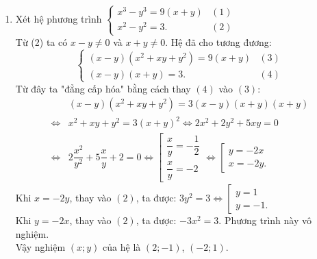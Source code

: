 \begin{ex}
{\begin{enumerate}
{\begin{align*}
\begin{array}{l}
\begin{array}{l}
 x \le 3\\
 x^2 - 8x + 10 = 0
 \end{array} \right.
 \end{array} \right. \Leftrightarrow \left[ \begin{array}{l}
 x = 2 + \sqrt 2 \\
 x = 4 - \sqrt 6 .
 \end{array} \right.
 \end{align*}}Kết hợp điều kiện ta được nghiệm của phương trình là 
$x = 2 + \sqrt 2, x = 4 - \sqrt 6$.
        \item Xét hệ phương trình $\left\{ \begin{array}{ll}
        x^3 - y^3 = 9(x + y)&(1)\\
        x^2 - y^2 = 3.&(2)
        \end{array} \right.$\\
    Từ (2) ta có $x - y \ne 0$ và $x + y \ne 0$. Hệ đã cho tương đương:
    $$\left\{ \begin{array}{ll}
    (x - y)(x^2 + xy + y^2) = 9(x + y)&(3)\\
    (x - y)(x + y) = 3.&(4)
    \end{array} \right.$$
  Từ đây ta "đẳng cấp hóa" bằng cách thay $(4)$ vào $(3)$:
 {\allowdisplaybreaks
 \begin{align*}
 &(x - y)(x^2 + xy + y^2) = 3(x - y)(x + y)(x + y)\\
 \Leftrightarrow& x^2 + xy + y^2 = 3(x + y)^2 \Leftrightarrow 2x^2 + 2y^2 + 5xy = 0\\
 \Leftrightarrow& 2\dfrac{x^2}{y^2} + 5\dfrac{x}{y} + 2 = 0 \Leftrightarrow \left[ \begin{array}{l}
 \dfrac{x}{y} =  - \dfrac{1}{2}\\
 \dfrac{x}{y} =  - 2
 \end{array} \right. \Leftrightarrow \left[ \begin{array}{l}
 y =  - 2x\\
 x =  - 2y.
 \end{array} \right.
 \end{align*}}Khi $x=-2y$, thay vào $(2)$, ta được: $3y^2 = 3 \Leftrightarrow \left[ \begin{array}{l}
y = 1\\
y =  - 1.
\end{array} \right.$\\
Khi $y=-2x$, thay vào $(2)$, ta được: $-3x^2 = 3$. Phương trình này vô nghiệm.\\
Vậy nghiệm $(x; y)$ của hệ là $(2; -1)$, $(-2; 1)$.
    \end{enumerate}
    }
\end{ex}

